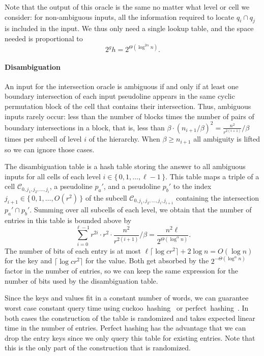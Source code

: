 Note that the output of this oracle is the same no matter what level or cell we
consider: for non-ambiguous inputs, all the information required to locate
\(q_i \cap q_j\) is included in the input.
We thus only need a single lookup table, and the space needed is proportional to
\begin{displaymath}
  2^g h
  =
  2^{\Theta(\log^{2\alpha} n)}.
\end{displaymath}

\paragraph*{Disambiguation}
An input for the intersection oracle is ambiguous if and only if at least one
boundary intersection of each input pseudoline appears in the same cyclic
permutation block of the cell that contains their intersection.
%
Thus, ambiguous inputs rarely occur:
%
less than the number of blocks times the number of pairs of boundary
intersections in a block,
%
that is, less than
\(
\beta \cdot {({n_{i+1}} / \beta)}^2
=
\frac{n^2}{r^{2(i+1)}} / \beta
\)
times per subcell of level \(i\) of the hierarchy.
%
When \(\beta \geq n_{i+1}\) all ambiguity is lifted so we can ignore
those cases.

The disambiguation table is a hash table storing the answer to all ambiguous
inputs for all cells of each level \(i \in \{\, 0,1, \ldots, \ell -1\,\}\).
%
This table maps a triple of a cell
\(\mathcal{C}_{0,j_1,j_2,\ldots,j_i}\),
a pseudoline \(p_a'\),
and a pseudoline \(p_b'\) to the index \( j_{i+1} \in \{\, 0,1, \ldots, O(r^2)\,\}\) of
the subcell \(\mathcal{C}_{0,j_1,j_2,\ldots,j_i,j_{i+1}}\) containing the
intersection \(p_a' \cap p_b'\).
%
Summing over all subcells of each level, we obtain that the
number of entries in this table is bounded above by
\begin{displaymath}
  \sum_{i=0}^{\ell - 1}  r^{2i} \cdot r^2 \cdot \frac{n^2}{r^{2(i+1)}} / \beta
  =
  \frac{n^2 \ell}{2^{\Theta(\log^{\alpha} n)}}.
\end{displaymath}
%
The number of bits of each entry is at most \(\ell \lceil \log cr^2 \rceil + 2 \log n =
O(\log n)\) for the key and
\(\lceil \log cr^2 \rceil\) for the value. Both get absorbed by the
\(2^{-\Theta(\log^{\alpha} n)}\) factor in the number of entries, so we can
keep the same expression for the number of bits used by the disambiguation table.

Since the keys and values fit in a constant number of words,
we can guarantee worst case constant query time using
cuckoo~hashing~\cite{PR04} or
perfect~hashing~\cite{FKS84}.
%
In both cases the construction of the table is randomized
and takes expected linear time in the number of entries.
Perfect hashing has the advantage that we can drop the entry keys since we
only query this table for existing entries.
Note that this is the only part of the construction that is randomized.

